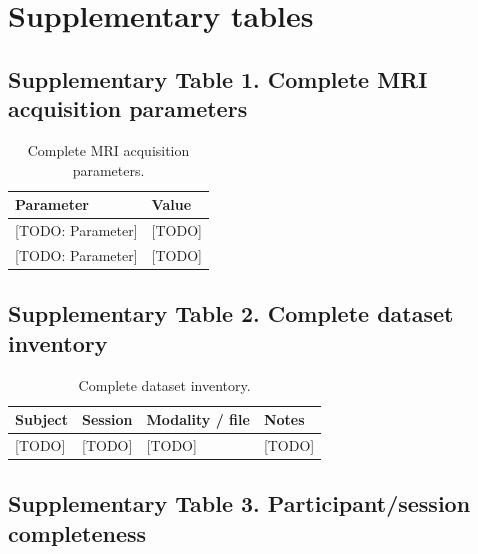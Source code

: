 
\section*{Supplementary tables}

\subsection*{Supplementary Table 1. Complete MRI acquisition parameters}

\begin{table}[htbp]
\centering
\caption{Complete MRI acquisition parameters.}
\label{tab:supp-mri-parameters}
\begin{tabular}{@{}ll@{}}
\toprule
\textbf{Parameter} & \textbf{Value} \\
\midrule
{[TODO: Parameter]} & {[TODO]} \\
{[TODO: Parameter]} & {[TODO]} \\
\bottomrule
\end{tabular}
\end{table}


\subsection*{Supplementary Table 2. Complete dataset inventory}

\begin{table}[htbp]
\centering
\caption{Complete dataset inventory.}
\label{tab:supp-dataset-inventory}
\begin{tabular}{@{}llll@{}}
\toprule
\textbf{Subject} & \textbf{Session} & \textbf{Modality / file} & \textbf{Notes} \\
\midrule
{[TODO]} & {[TODO]} & {[TODO]} & {[TODO]} \\
\bottomrule
\end{tabular}
\end{table}


\subsection*{Supplementary Table 3. Participant/session completeness}

